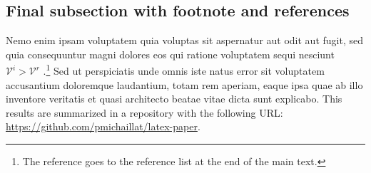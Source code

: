 \documentclass[letterpaper,12pt,leqno]{article}
\begin{document}
\subsection{Final subsection with footnote and references}\label{a:subappendix}

Nemo enim ipsam voluptatem quia voluptas sit aspernatur aut odit aut fugit, sed quia consequuntur magni dolores eos qui ratione voluptatem sequi nesciunt $\mathcal{V}^i > \mathcal{V}^r$ \citep{MS21b}.\footnote{The reference goes to the reference list at the end of the main text.} Sed ut perspiciatis unde omnis iste natus error sit voluptatem accusantium doloremque laudantium, totam rem aperiam, eaque ipsa quae ab illo inventore veritatis et quasi architecto beatae vitae dicta sunt explicabo. This results are summarized in a repository with the following URL: \url{https://github.com/pmichaillat/latex-paper}.
\end{document}
